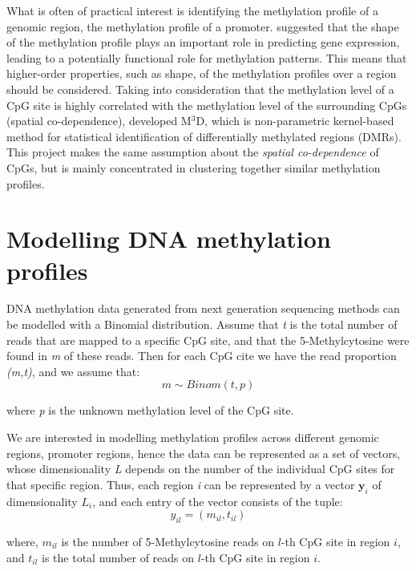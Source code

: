 What is often of practical interest is identifying the methylation profile of a genomic region, \eg the methylation profile of a promoter. \cite{Vanderkraats2013} suggested that the shape of the methylation profile plays an important role in predicting gene expression, leading to a potentially functional role for methylation patterns. This means that higher-order properties, such as shape, of the methylation profiles over a region should be considered. Taking into consideration that the methylation level of a CpG site is highly correlated with the methylation level of the surrounding CpGs (\ie spatial co-dependence), \cite{Mayo2014} developed M$^3$D, which is non-parametric kernel-based method for statistical identification of differentially methylated regions (DMRs). This project makes the same assumption about the \emph{spatial co-dependence} of CpGs, but is mainly concentrated in clustering together similar methylation profiles.



\section{Modelling DNA methylation profiles} \label{model-meth-profiles-s}
DNA methylation data generated from next generation sequencing methods can be modelled with a Binomial distribution. Assume that \emph{t} is the total number of reads that are mapped to a specific CpG site, and that the 5-Methylcytosine were found in \emph{m} of these reads. Then for each CpG cite we have the read proportion \emph{(m,t)}, and we assume that:
\begin{equation} \label{binom-1d-f}
	m \sim Binom(t, p)
\end{equation}

where \emph{p} is the unknown methylation level of the CpG site.

We are interested in modelling methylation profiles across different genomic regions, \eg promoter regions, hence the data can be represented as a set of vectors, whose dimensionality \emph{L} depends on the number of the individual CpG sites for that specific region. Thus, each region \emph{i} can be represented by a vector $\mathbf{y}_{i}$ of dimensionality $L_{i}$, and each entry of the vector consists of the tuple:
\begin{equation}
	y_{il} = (m_{il},t_{il})
\end{equation}

where, $m_{il}$ is the number of 5-Methylcytosine reads on $l$-th CpG site in region $i$, and $t_{il}$ is the total number of reads on $l$-th CpG site in region $i$. 

